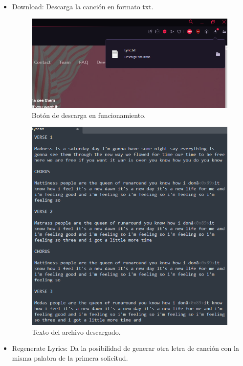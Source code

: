 \documentclass[12pt, a4paper, titlepage]{article}
\begin{document}
	\begin{itemize}
		\item Download: Descarga la canción en formato txt.
		
		\begin{figure}[H] 
			\includegraphics[width=13.5cm]{./Imagenes/Capturas/Download.png}
			\centering \caption{Botón de descarga en funcionamiento.}
		\end{figure}
	
		\begin{figure}[H] 
			\includegraphics[width=13.5cm]{./Imagenes/Capturas/Textodescargado.png}
			\centering \caption{Texto del archivo descargado.}
		\end{figure}
		
		\item Regenerate Lyrics: Da la posibilidad de generar otra letra de canción con la misma palabra de la primera solicitud.
		

\end{itemize}
\end{document}
